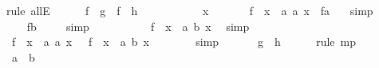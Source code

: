 \begin{isabellebody}
\ {\isacharparenleft}rule\ allE{\isacharparenright}\ \isanewline
\ \ \isamarkupfalse%
\ {}{\isacharcolon}\ {\isachardoublequoteopen}f\ {\isasymcirc}\ {\isacharquery}g\ {\isacharequal}\ f\ {\isasymcirc}\ {\isacharquery}h{\isachardoublequoteclose}\ \isanewline
\ \ \isamarkupfalse%
\ \isanewline
\ \ \ \ \isamarkupfalse%
\ x\isanewline
\ \ \ \ \isamarkupfalse%
\ {\isachardoublequoteopen}\ {\isacharparenleft}f\ {\isasymcirc}\ {\isacharparenleft}{\isasymlambda}x\ {\isacharcolon}{\isacharcolon}\ {\isacharprime}a{\isachardot}\ a{\isacharparenright}{\isacharparenright}\ x\ {\isacharequal}\ f{\isacharparenleft}a{\isacharparenright}\ {\isachardoublequoteclose}\ \isamarkupfalse%
\ simp\isanewline
\ \ \ \ \isamarkupfalse%
\ \isamarkupfalse%
\ {\isachardoublequoteopen}{\isachardot}{\isachardot}{\isachardot}\ {\isacharequal}\ f{\isacharparenleft}b{\isacharparenright}{\isachardoublequoteclose}\ \isamarkupfalse%
\ {}\ \isamarkupfalse%
\ simp\isanewline
\ \ \ \ \isamarkupfalse%
\ \isamarkupfalse%
\ {\isachardoublequoteopen}{\isachardot}{\isachardot}{\isachardot}\ {\isacharequal}\ \ {\isacharparenleft}f\ {\isasymcirc}\ {\isacharparenleft}{\isasymlambda}x\ {\isacharcolon}{\isacharcolon}\ {\isacharprime}a{\isachardot}\ b{\isacharparenright}{\isacharparenright}\ x{\isachardoublequoteclose}\ \isamarkupfalse%
\ simp\isanewline
\ \ \ \ \isamarkupfalse%
\ \isamarkupfalse%
\ {\isachardoublequoteopen}\ {\isacharparenleft}f\ {\isasymcirc}\ {\isacharparenleft}{\isasymlambda}x\ {\isacharcolon}{\isacharcolon}\ {\isacharprime}a{\isachardot}\ a{\isacharparenright}{\isacharparenright}\ x\ {\isacharequal}\ \ {\isacharparenleft}f\ {\isasymcirc}\ {\isacharparenleft}{\isasymlambda}x\ {\isacharcolon}{\isacharcolon}\ {\isacharprime}a{\isachardot}\ b{\isacharparenright}{\isacharparenright}\ x{\isachardoublequoteclose}\isanewline
\ \ \ \ \ \ \isamarkupfalse%
\ simp\isanewline
\ \ \isamarkupfalse%
\isanewline
\ \ \isamarkupfalse%
\ {\isachardoublequoteopen}{\isacharquery}g\ {\isacharequal}\ {\isacharquery}h{\isachardoublequoteclose}\ \isamarkupfalse%
\ {}\ {}\ \isamarkupfalse%
\ {\isacharparenleft}rule\ mp{\isacharparenright}\isanewline
\ \ \isamarkupfalse%
\ \isamarkupfalse%
\ {\isachardoublequoteopen}\ a\ {\isacharequal}\ b{\isachardoublequoteclose}\ \isamarkupfalse%

\end{isabellebody}
